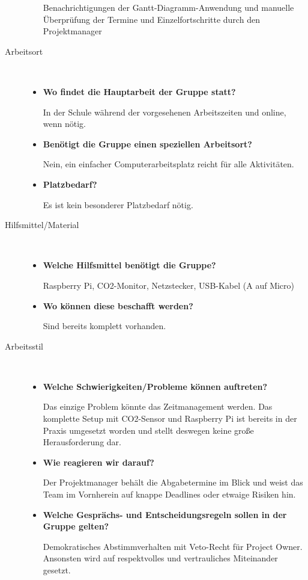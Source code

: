 \documentclass[a4paper,
    11pt,
    headings=small,
    ngerman,
    listof=totoc,
    numbers=noenddot]{scrreprt}[2021/11/13]
\begin{document}
\begin{description}
\begin{itemize}
                Benachrichtigungen der Gantt-Diagramm-Anwendung und manuelle Überprüfung der Termine und Einzelfortschritte durch den Projektmanager
        \end{itemize}
  \item[Arbeitsort] \
        \begin{itemize}
          \item \textbf{Wo findet die Hauptarbeit der Gruppe statt?}

                In der Schule während der vorgesehenen Arbeitszeiten und online, wenn nötig.

          \item \textbf{Benötigt die Gruppe einen speziellen Arbeitsort?}

                Nein, ein einfacher Computerarbeitsplatz reicht für alle Aktivitäten.

          \item \textbf{Platzbedarf?}

                Es ist kein besonderer Platzbedarf nötig.
        \end{itemize}

        \newpage

  \item[Hilfsmittel/Material] \
        \begin{itemize}
          \item \textbf{Welche Hilfsmittel benötigt die Gruppe?}

                Raspberry Pi, CO2-Monitor, Netzstecker, USB-Kabel (A auf Micro)

          \item \textbf{Wo können diese beschafft werden?}

                Sind bereits komplett vorhanden.
        \end{itemize}
  \item[Arbeitsstil] \
        \begin{itemize}
          \item \textbf{Welche Schwierigkeiten/Probleme können auftreten?}

                Das einzige Problem könnte das Zeitmanagement werden. Das komplette Setup mit CO2-Sensor und Raspberry Pi ist bereits in der Praxis umgesetzt worden und stellt deswegen keine große Herausforderung dar.

          \item \textbf{Wie reagieren wir darauf?}

                Der Projektmanager behält die Abgabetermine im Blick und weist das Team im Vornherein auf knappe Deadlines oder etwaige Risiken hin.

          \item \textbf{Welche Gesprächs- und Entscheidungsregeln sollen in der Gruppe gelten?}

                Demokratisches Abstimmverhalten mit Veto-Recht für Project Owner. Ansonsten wird auf respektvolles und vertrauliches Miteinander gesetzt.
        \end{itemize}
\end{description}
\end{document}
